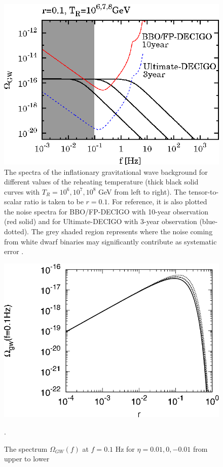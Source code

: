 \documentclass[11pt,a4paper,twoside]{book}
\begin{document}
\begin{figure}
	\centering
	\includegraphics[width=0.7\linewidth, height=0.3\textheight]{Images/Chap3/Kurojanagi_Nakayama_Fig1}
	\caption{The spectra of the inflationary gravitational wave background for different values of the reheating temperature (thick black solid curves with $ T_{R}=10^{6},10^{7},10^{8} $ GeV from left to right). The tensor-to-scalar ratio is taken to be $ r=0.1 $. For reference, it is also plotted the noise spectra for BBO/FP-DECIGO with 10-year observation (red solid) and for Ultimate-DECIGO with 3-year observation (blue-dotted).  The grey  shaded region represents where the noise coming from white dwarf binaries may significantly contribute as systematic error \cite{Chap3:ProspectsForDeterminationWithDetectors}.}
	\label{fig:kurojanaginakayamafig1}
\end{figure}
\begin{figure}
	\centering
	\includegraphics[width=0.7\linewidth, height=0.3\textheight]{Images/Chap3/Nakayama_Saito_Fig2}
	\caption{The spectrum $\Omega_{GW}(f)$ at $ f=0.1 $ Hz for $ \eta=0.01,0,-0.01 $ from upper to lower \cite{Chap3:ProibingReheatingTemperature2008}}.
	\label{fig:nakayamasaitofig2}
\end{figure}
\end{document}
